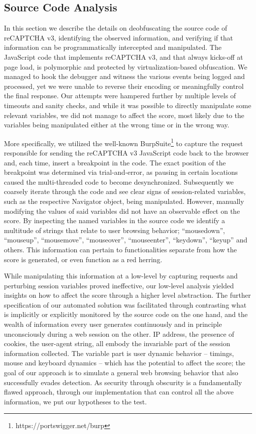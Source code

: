 \subsection{Source Code Analysis}
In this section we describe the details on deobfuscating the source code of reCAPTCHA v3, identifying the observed information, and verifying if that information can be programmatically intercepted and manipulated.
The JavaScript code that implements reCAPTCHA v3, and that always kicks-off at page load, is polymorphic and protected by virtualization-based obfuscation.
We managed to hook the debugger and witness the various events being logged and processed, yet we were unable to reverse their encoding or meaningfully control the final response.
Our attempts were hampered further by multiple levels of timeouts and sanity checks, and while it was possible to directly manipulate some relevant variables, we did not manage to affect the score, most likely due to the variables being manipulated either at the wrong time or in the wrong way. 

More specifically, we utilized the well-known BurpSuite\footnote{https://portswigger.net/burp} to capture the request responsible for sending the reCAPTCHA v3 JavaScript code back to the browser and, each time, insert a breakpoint in the code.
The exact position of the breakpoint was determined via trial-and-error, as pausing in certain locations caused the multi-threaded code to become desynchronized.
Subsequently we coarsely iterate through the code and see clear signs of session-related variables, such as the respective Navigator object, being manipulated.
However, manually modifying the values of said variables did not have an observable effect on the score. 
By inspecting the named variables in the source code we identify a multitude of strings that relate to user browsing behavior; ``mousedown'', ``mouseup'', ``mousemove'', ``mouseover'', ``mouseenter'', ``keydown'', ``keyup'' and others.
This information can pertain to functionalities separate from how the score is generated, or even function as a red herring.

While manipulating this information at a low-level by capturing requests and perturbing session variables proved ineffective, our low-level analysis yielded insights on how to affect the score through a higher level abstraction.
The further specification of our automated solution was facilitated through contrasting what is implicitly or explicitly monitored by the source code on the one hand, and the wealth of information every user generates continuously and in principle unconsciously during a web session on the other.
IP address, the presence of cookies, the user-agent string, all embody the invariable part of the session information collected.
The variable part is user dynamic behavior -- timings, mouse and keyboard dynamics -- which has the potential to affect the score; the goal of our approach is to simulate a general web browsing behavior that also successfully evades detection.
As security through obscurity is a fundamentally flawed approach, through our implementation that can control all the above information, we put our hypotheses to the test.

